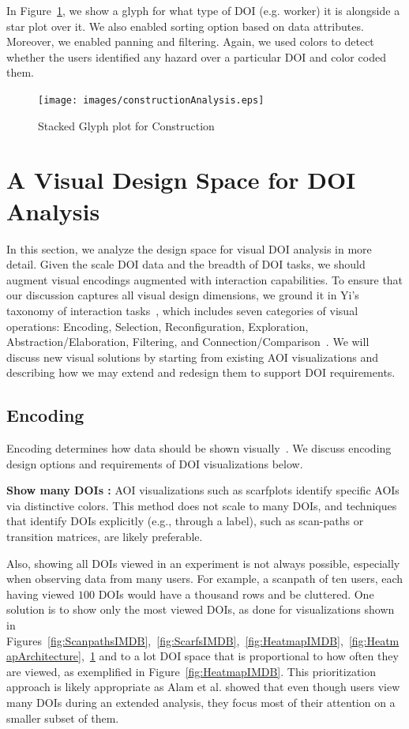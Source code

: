 In Figure~\ref{fig:constructionAnalysis}, we show a glyph for what type of DOI (e.g. worker) it is alongside a star plot over it. We also enabled sorting option based on data attributes. Moreover, we enabled panning and filtering. Again, we used colors to detect whether the users identified any hazard over a particular DOI and color coded them. 

\begin{figure}
  \centering
  \texttt{[image: images/constructionAnalysis.eps]}
  \caption{Stacked Glyph plot for Construction}
	\label{fig:constructionAnalysis}
\end{figure}

\section{A Visual Design Space for DOI Analysis}

In this section, we analyze the design space for visual DOI analysis in more detail. Given the scale DOI data and the breadth of DOI tasks, we should augment visual encodings augmented with interaction capabilities. To ensure that our discussion captures all visual design dimensions, we ground it in Yi's taxonomy of interaction tasks~\cite{Yi07}, which includes seven categories of visual operations: Encoding, Selection, Reconfiguration, Exploration, Abstraction/Elaboration, Filtering, and Connection/Comparison~\cite{Yi07}. We will discuss new visual solutions by starting from existing AOI visualizations and describing how we may extend and redesign them to support DOI requirements. 

\subsection{Encoding}
\label{sec:Encoding}
Encoding determines how data should be shown visually~\cite{Yi07}. We discuss encoding design options and requirements of DOI visualizations below.

\textbf{Show many DOIs :} AOI visualizations such as scarfplots identify specific AOIs via distinctive colors. This method does not scale to many DOIs, and techniques that identify DOIs explicitly (e.g., through a label), such as scan-paths or transition matrices, are likely preferable. 

Also, showing all DOIs viewed in an experiment is not always possible, especially when observing data from many users. For example, a scanpath of ten users, each having viewed $100$ DOIs would have a thousand rows and be cluttered. One solution is to show only the most viewed DOIs, as done for visualizations shown in Figures~\ref{fig:ScanpathsIMDB},~\ref{fig:ScarfsIMDB},~\ref{fig:HeatmapIMDB},~\ref{fig:HeatmapArchitecture},~\ref{fig:constructionAnalysis} and to a lot DOI space that is proportional to how often they are viewed, as exemplified in Figure~\ref{fig:HeatmapIMDB}. This prioritization approach is likely appropriate as Alam et al. showed that even though users view many DOIs during an extended analysis, they focus most of their attention on a smaller subset of them. 

